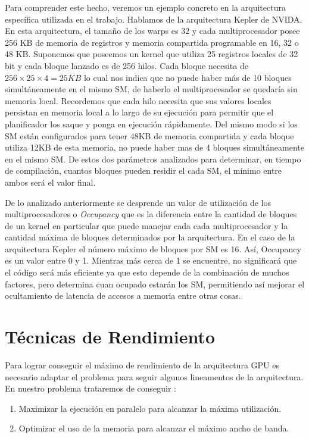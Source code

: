 \documentclass[a4paper,openright,12pt, oneside]{book}
\begin{document}
Para comprender este hecho, veremos un ejemplo concreto en la arquitectura
espec\'ifica utilizada en el trabajo. Hablamos de la arquitectura Kepler de NVIDA.
En esta arquitectura, el tama\~no de los warps es 32 y cada multiprocesador posee
256 KB de memoria de registros y memoria compartida programable en 16, 32 o 48 KB.
Suponemos que poseemos un kernel que utiliza 25 registros locales de 32 bit y 
cada bloque lanzado es de 256 hilos. Cada bloque
necesita de $256 \times 25 \times 4 = 25 KB$ lo cual nos indica que no puede haber
m\'as de 10 bloques simult\'aneamente en el mismo SM, de haberlo el multiprocesador se
quedar\'ia sin memoria local. Recordemos que cada hilo necesita que sus valores locales
persistan en memoria local a lo largo de su ejecuci\'on para permitir que el planificador
los saque y ponga en ejecuci\'on r\'apidamente. Del mismo modo si los SM est\'an configurados
para tener 48KB de memoria compartida y cada bloque utiliza 12KB de esta memoria,
no puede haber mas de 4 bloques simult\'aneamente en el mismo SM. De estos dos
par\'ametros analizados para determinar, en tiempo de compilaci\'on, cuantos bloques
pueden residir el cada SM, el m\'inimo entre ambos ser\'a el valor final.

De lo analizado anteriormente se desprende un valor de utilizaci\'on de los multiprocesadores
o \textit{Occupancy} que es la diferencia entre la cantidad de bloques de un kernel
en particular que puede manejar cada cada multiprocesador y la cantidad m\'axima de
bloques determinados por la arquitectura. En el caso de la arquitectura Kepler el n\'umero m\'aximo
de bloques por SM es 16. As\'i, Occupancy es un valor entre 0 y 1. Mientras m\'as cerca de 1 se encuentre, no significar\'a
que el c\'odigo ser\'a m\'as eficiente ya que esto depende de la combinaci\'on de muchos
factores, pero determina cuan ocupado estar\'an los SM, permitiendo as\'i mejorar
el ocultamiento de latencia de accesos a memoria entre otras cosas.


\section{T\'ecnicas de Rendimiento}

Para lograr conseguir el m\'aximo de rendimiento de la arquitectura GPU es necesario
adaptar el problema para seguir algunos lineamentos de la arquitectura. En nuestro
problema trataremos de conseguir :

\begin{enumerate}
\item Maximizar la ejecuci\'on en paralelo para alcanzar la m\'axima utilizaci\'on.
\item Optimizar el uso de la memoria para alcanzar el m\'aximo ancho de banda.
\end{enumerate}
\end{document}
